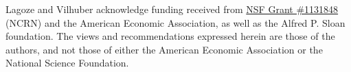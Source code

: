 Lagoze and Vilhuber acknowledge funding received from \href{http://www.nsf.gov/awardsearch/showAward.do?AwardNumber=1131848}{NSF Grant \#1131848} (NCRN) and the American Economic Association, as well as the Alfred P. Sloan foundation. The views and recommendations expressed herein are those of the authors, and not those of either the American Economic Association or the National Science Foundation.